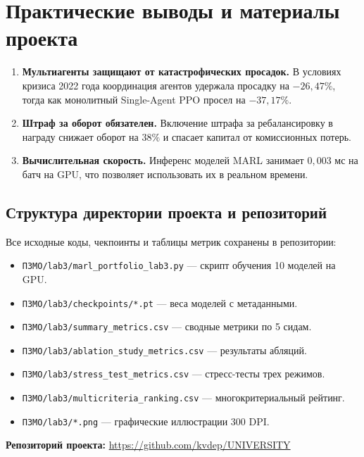 \documentclass[11pt,a4paper]{article}
\begin{document}
\section{Практические выводы и материалы проекта}

\begin{enumerate}[leftmargin=*]
\item \textbf{Мультиагенты защищают от катастрофических просадок.} В условиях кризиса 2022 года координация агентов удержала просадку на $-26{,}47\%$, тогда как монолитный Single-Agent PPO просел на $-37{,}17\%$.
\item \textbf{Штраф за оборот обязателен.} Включение штрафа за ребалансировку в награду снижает оборот на $38\%$ и спасает капитал от комиссионных потерь.
\item \textbf{Вычислительная скорость.} Инференс моделей MARL занимает $0{,}003$ мс на батч на GPU, что позволяет использовать их в реальном времени.
\end{enumerate}

\subsection{Структура директории проекта и репозиторий}

Все исходные коды, чекпоинты и таблицы метрик сохранены в репозитории:
\begin{itemize}[leftmargin=*]
\item \texttt{ПЗМО/lab3/marl\_portfolio\_lab3.py} --- скрипт обучения 10 моделей на GPU.
\item \texttt{ПЗМО/lab3/checkpoints/*.pt} --- веса моделей с метаданными.
\item \texttt{ПЗМО/lab3/summary\_metrics.csv} --- сводные метрики по 5 сидам.
\item \texttt{ПЗМО/lab3/ablation\_study\_metrics.csv} --- результаты абляций.
\item \texttt{ПЗМО/lab3/stress\_test\_metrics.csv} --- стресс-тесты трех режимов.
\item \texttt{ПЗМО/lab3/multicriteria\_ranking.csv} --- многокритериальный рейтинг.
\item \texttt{ПЗМО/lab3/*.png} --- графические иллюстрации 300 DPI.
\end{itemize}

\noindent\textbf{Репозиторий проекта:} \url{https://github.com/kvdep/UNIVERSITY}
\end{document}
